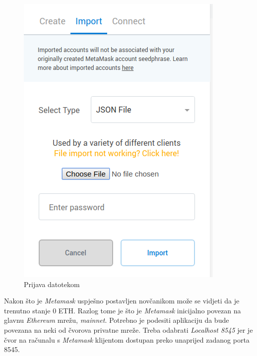 \documentclass[times, utf8, zavrsni]{fer}
\begin{document}
\begin{figure}[ht]
\begin{minipage}[b]{0.4\textwidth}
    \includegraphics[width=\textwidth]{mmiportjason.png}
    \caption{Prijava datotekom}
  \end{minipage}
\end{figure}

Nakon što je \emph{Metamask} uspješno postavljen novčanikom može se vidjeti da je trenutno stanje 0 ETH. Razlog tome je što je \emph{Metamask} inicijalno povezan
na glavnu \emph{Ethereum} mrežu, \emph{mainnet}. Potrebno je podesiti aplikaciju da bude povezana na neki od čvorova privatne mreže. Treba odabrati \emph{Localhost 8545}
jer je čvor na računalu s \emph{Metamask} klijentom dostupan preko unaprijed zadanog porta 8545. 

\pagebreak
\end{document}
